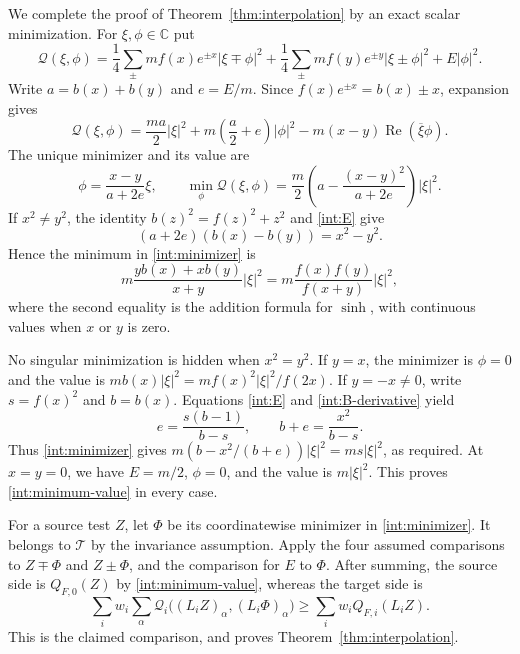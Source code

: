 \documentclass[11pt]{article}
\newcommand{\C}{\mathbb C}
\theoremstyle{remark}\newtheorem{remark}[theorem]{Remark}
\begin{document}
We complete the proof of Theorem~\ref{thm:interpolation} by an exact
scalar minimization.  For $\xi,\phi\in\C$ put
\begin{equation}\label{int:quadratic}
 \mathcal Q(\xi,\phi)=
 \frac14\sum_{\pm}mf(x)e^{\pm x}|\xi\mp\phi|^2
 +\frac14\sum_{\pm}mf(y)e^{\pm y}|\xi\pm\phi|^2
 +E|\phi|^2.
\end{equation}
Write $a=b(x)+b(y)$ and $e=E/m$.  Since
$f(x)e^{\pm x}=b(x)\pm x$, expansion gives
\[
 \mathcal Q(\xi,\phi)
 =\frac{ma}{2}|\xi|^2
  +m\left(\frac a2+e\right)|\phi|^2
  -m(x-y)\operatorname{Re}(\overline\xi\phi).
\]
The unique minimizer and its value are
\begin{equation}\label{int:minimizer}
 \phi=\frac{x-y}{a+2e}\xi,
 \qquad
 \min_\phi\mathcal Q(\xi,\phi)
 =\frac m2\left(a-\frac{(x-y)^2}{a+2e}\right)|\xi|^2.
\end{equation}
If $x^2\ne y^2$, the identity $b(z)^2=f(z)^2+z^2$ and
\eqref{int:E} give
\[
 (a+2e)(b(x)-b(y))=x^2-y^2.
\]
Hence the minimum in \eqref{int:minimizer} is
\begin{equation}\label{int:minimum-value}
 m\frac{y b(x)+x b(y)}{x+y}|\xi|^2
 =m\frac{f(x)f(y)}{f(x+y)}|\xi|^2,
\end{equation}
where the second equality is the addition formula for $\sinh$,
with continuous values when $x$ or $y$ is zero.

No singular minimization is hidden when $x^2=y^2$.
If $y=x$, the minimizer is $\phi=0$ and the value is
$mb(x)|\xi|^2=mf(x)^2|\xi|^2/f(2x)$.
If $y=-x\ne0$, write $s=f(x)^2$ and $b=b(x)$.
Equations \eqref{int:E} and \eqref{int:B-derivative} yield
\[
 e=\frac{s(b-1)}{b-s},\qquad
 b+e=\frac{x^2}{b-s}.
\]
Thus \eqref{int:minimizer} gives
$m(b-x^2/(b+e))|\xi|^2=ms|\xi|^2$, as required.
At $x=y=0$, we have $E=m/2$, $\phi=0$, and the value is $m|\xi|^2$.
This proves \eqref{int:minimum-value} in every case.

For a source test $Z$, let $\Phi$ be its coordinatewise minimizer in
\eqref{int:minimizer}.  It belongs to $\mathcal T$ by the invariance
assumption.  Apply the four assumed comparisons to $Z\mp\Phi$ and
$Z\pm\Phi$, and the comparison for $E$ to $\Phi$.
After summing, the source side is $Q_{F,0}(Z)$ by
\eqref{int:minimum-value}, whereas the target side is
\[
 \sum_i w_i\sum_\alpha
   \mathcal Q_i\bigl((L_iZ)_\alpha,(L_i\Phi)_\alpha\bigr)
 \ge\sum_i w_i Q_{F,i}(L_iZ).
\]
This is the claimed comparison, and proves
Theorem~\ref{thm:interpolation}.
\end{document}
